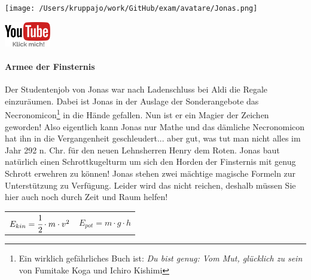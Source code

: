 \documentclass[a4paper, 9pt]{scrartcl}\usepackage[]{graphicx}\usepackage[]{xcolor}
\begin{document}
 
\ifcollection
\begin{flushright}
\tiny\vspace{-3Ex}
\textbf{\examinhaltstart}
\exammodulemathstat
\vspace{-4Ex}
\end{flushright}
\begin{minipage}[t]{0.5\textwidth}
\texttt{[image: /Users/kruppajo/work/GitHub/exam/avatare/Jonas.png]}
\end{minipage}
\begin{minipage}[t]{0.5\textwidth}
\hfill
\href{https://youtu.be/Bbu6n8MXxQk}{\includegraphics[width = 2cm]{img/youtube}}
\end{minipage}
\fi



\ifcollection
\paragraph{Armee der Finsternis}
\fi



Der Studentenjob von Jonas war nach Ladenschluss bei Aldi die Regale einzuräumen. Dabei ist Jonas in der Auslage der Sonderangebote das Necronomicon\footnote{Ein wirklich gefährliches Buch ist: \textit{Du bist genug: Vom Mut, glücklich zu sein} von Fumitake Koga und Ichiro Kishimi} in die Hände gefallen. Nun ist er ein Magier der Zeichen geworden! Also eigentlich kann Jonas nur Mathe und das dämliche Necronomicon hat ihn in die Vergangenheit geschleudert... aber gut, was tut man nicht alles im Jahr 292 n. Chr. für den neuen Lehnsherren Henry dem Roten. Jonas baut natürlich einen Schrottkugelturm um sich den
Horden der Finsternis mit genug Schrott erwehren zu können! Jonas stehen zwei mächtige magische Formeln zur Unterstützung zu Verfügung. Leider wird das nicht reichen, deshalb müssen Sie hier auch noch durch Zeit und Raum helfen!

\begin{center}
  \begin{tabular}{cc}
    $E_{kin} = \cfrac{1}{2}\cdot m \cdot v^2$ & $E_{pot} = m \cdot g \cdot h$\\
  \end{tabular}
\end{center}
\end{document}
